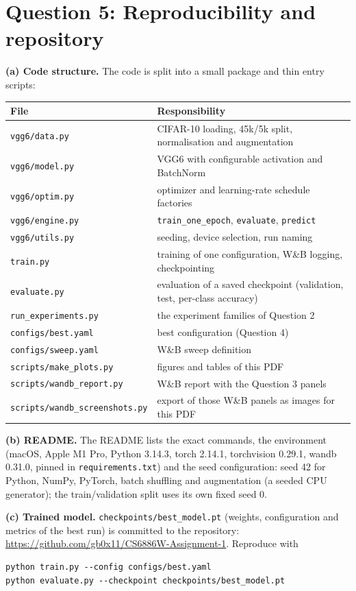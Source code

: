 \documentclass[11pt,a4paper]{article}
\newcommand{\repo}{\url{https://github.com/gb0x11/CS6886W-Assignment-1}}
\begin{document}
\section*{Question 5: Reproducibility and repository}

\textbf{(a) Code structure.} The code is split into a small package and thin entry scripts:
\begin{center}
\small
\begin{tabular}{ll}
\toprule
File & Responsibility \\
\midrule
\texttt{vgg6/data.py} & CIFAR-10 loading, 45k/5k split, normalisation and augmentation \\
\texttt{vgg6/model.py} & VGG6 with configurable activation and BatchNorm \\
\texttt{vgg6/optim.py} & optimizer and learning-rate schedule factories \\
\texttt{vgg6/engine.py} & \texttt{train\_one\_epoch}, \texttt{evaluate}, \texttt{predict} \\
\texttt{vgg6/utils.py} & seeding, device selection, run naming \\
\texttt{train.py} & training of one configuration, W\&B logging, checkpointing \\
\texttt{evaluate.py} & evaluation of a saved checkpoint (validation, test, per-class accuracy) \\
\texttt{run\_experiments.py} & the experiment families of Question 2 \\
\texttt{configs/best.yaml} & best configuration (Question 4) \\
\texttt{configs/sweep.yaml} & W\&B sweep definition \\
\texttt{scripts/make\_plots.py} & figures and tables of this PDF \\
\texttt{scripts/wandb\_report.py} & W\&B report with the Question 3 panels \\
\texttt{scripts/wandb\_screenshots.py} & export of those W\&B panels as images for this PDF \\
\bottomrule
\end{tabular}
\end{center}

\textbf{(b) README.} The README lists the exact commands, the environment (macOS, Apple M1 Pro, Python 3.14.3, torch 2.14.1, torchvision 0.29.1, wandb 0.31.0, pinned in \texttt{requirements.txt}) and the seed configuration: seed 42 for Python, NumPy, PyTorch, batch shuffling and augmentation (a seeded CPU generator); the train/validation split uses its own fixed seed 0.

\textbf{(c) Trained model.} \texttt{checkpoints/best\_model.pt} (weights, configuration and metrics of the best run) is committed to the repository: \repo. Reproduce with
\begin{Verbatim}[frame=single,fontsize=\small]
python train.py --config configs/best.yaml
python evaluate.py --checkpoint checkpoints/best_model.pt
\end{Verbatim}
\end{document}
